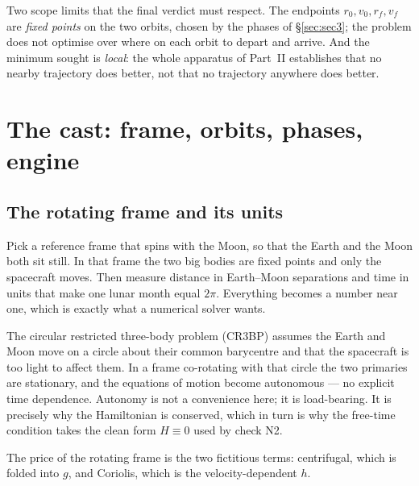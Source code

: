 \documentclass[11pt]{article}
\begin{document}
\begin{warn}
Two scope limits that the final verdict must respect. The endpoints
$r_0, v_0, r_f, v_f$ are \emph{fixed points} on the two orbits, chosen by the
phases of \S\ref{sec:sec3}; the problem does not optimise over where on each
orbit to depart and arrive. And the minimum sought is \emph{local}: the whole
apparatus of Part~II establishes that no nearby trajectory does better, not
that no trajectory anywhere does better.
\end{warn}

\section{The cast: frame, orbits, phases, engine}\label{sec:cast}

\subsection{The rotating frame and its units}

\begin{eli}
Pick a reference frame that spins with the Moon, so that the Earth and the Moon
both sit still. In that frame the two big bodies are fixed points and only the
spacecraft moves. Then measure distance in Earth--Moon separations and time in
units that make one lunar month equal $2\pi$. Everything becomes a number near
one, which is exactly what a numerical solver wants.
\end{eli}

\begin{intu}
The circular restricted three-body problem (CR3BP) assumes the Earth and Moon
move on a circle about their common barycentre and that the spacecraft is too
light to affect them. In a frame co-rotating with that circle the two primaries
are stationary, and the equations of motion become autonomous --- no explicit
time dependence. Autonomy is not a convenience here; it is load-bearing. It is
precisely why the Hamiltonian is conserved, which in turn is why the free-time
condition takes the clean form $H \equiv 0$ used by check N2.

The price of the rotating frame is the two fictitious terms: centrifugal, which
is folded into $g$, and Coriolis, which is the velocity-dependent $h$.
\end{intu}
\end{document}
